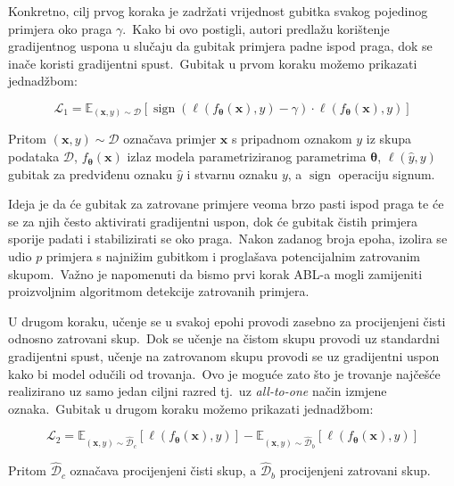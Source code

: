 \documentclass[diplomskirad]{fer}
\begin{document}
Konkretno, cilj prvog koraka je zadržati vrijednost gubitka svakog pojedinog primjera oko praga $\gamma$.\
Kako bi ovo postigli, autori predlažu korištenje gradijentnog uspona u slučaju da gubitak primjera padne ispod praga, dok se inače koristi gradijentni spust.\ Gubitak u prvom koraku možemo prikazati jednadžbom:

\begin{equation}
  \mathcal{L}_1 = \mathbb{E}_{(\bm{x}, y) \sim \mathcal{D}} \left[ \operatorname{sign} \left( \ell(f_{\bm{\theta}}(\bm{x}), y) - \gamma \right) \cdot \ell(f_{\bm{\theta}}(\bm{x}), y) \right]
  \label{eq:abl1}
\end{equation}

Pritom $(\bm{x}, y) \sim \mathcal{D}$ označava primjer $\bm{x}$ s pripadnom oznakom $y$ iz skupa podataka $\mathcal{D}$, $f_{\bm{\theta}}(\bm{x})$ izlaz modela parametriziranog parametrima $\bm{\theta}$, $\ell(\hat{y}, y)$ gubitak za predviđenu oznaku $\hat{y}$ i stvarnu oznaku $y$, a $\operatorname{sign}$ operaciju signum.\ 
  
Ideja je da će gubitak za zatrovane primjere veoma brzo pasti ispod praga te će se za njih često aktivirati gradijentni uspon, dok će gubitak čistih primjera sporije padati i stabilizirati se oko praga.\ 
Nakon zadanog broja epoha, izolira se udio $p$ primjera s najnižim gubitkom i proglašava potencijalnim zatrovanim skupom.\ Važno je napomenuti da bismo prvi korak ABL-a mogli zamijeniti proizvoljnim algoritmom detekcije zatrovanih primjera.\ 
  
U drugom koraku, učenje se u svakoj epohi provodi zasebno za procijenjeni čisti odnosno zatrovani skup.\ 
Dok se učenje na čistom skupu provodi uz standardni gradijentni spust, učenje na zatrovanom skupu provodi se uz gradijentni uspon kako bi model odučili od trovanja.\ 
Ovo je moguće zato što je trovanje najčešće realizirano uz samo jedan ciljni razred tj.\ uz \textit{all-to-one} način izmjene oznaka.\ Gubitak u drugom koraku možemo prikazati jednadžbom:

\begin{equation}
  \mathcal{L}_2 = \mathbb{E}_{(\bm{x}, y) \sim \hat{\mathcal{D}}_c} \left[ \ell(f_{\bm{\theta}}(\bm{x}), y) \right] - \mathbb{E}_{(\bm{x}, y) \sim \hat{\mathcal{D}}_b} \left[ \ell(f_{\bm{\theta}}(\bm{x}), y) \right]
  \label{eq:abl2}
\end{equation}

Pritom $\hat{\mathcal{D}}_c$ označava procijenjeni čisti skup, a $\hat{\mathcal{D}}_b$ procijenjeni zatrovani skup.\
\end{document}
